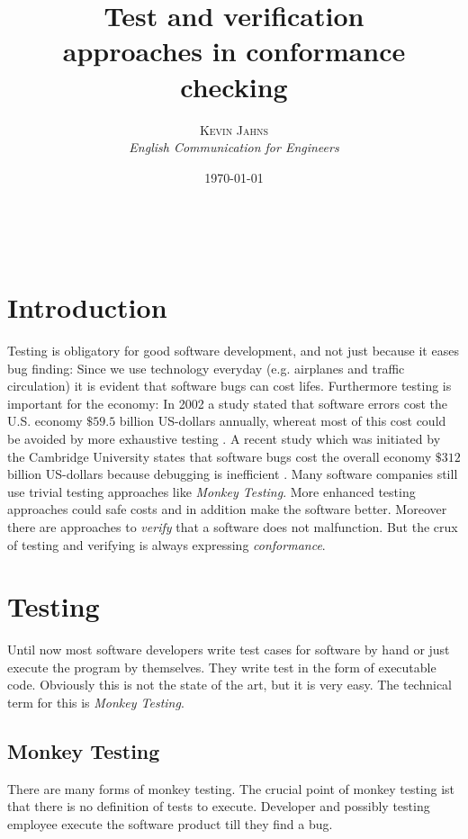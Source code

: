 \documentclass[a4paper, 12pt]{article} %
\title{\textbf{Test and verification}\\ %
approaches in conformance checking} %
\author{\textsc{Kevin Jahns} %
\\{\textit{English Communication for Engineers}}} %
\date{\today} %
\makeatletter
\renewcommand{\maketitle}{ %
\begin{flushright} %
{\LARGE\@title} %

\vspace{50pt} %

{\large\@author} %
\\\@date %

\vspace{40pt} %
\end{flushright}
}
\makeatother
\begin{document}
\maketitle %


\section*{Introduction}
Testing is obligatory for good software development, and not just because it
eases bug finding: Since we use technology everyday (e.g. airplanes and traffic
circulation) it is evident that software bugs can cost lifes. Furthermore
testing is important for the economy: In 2002 a study stated that software errors cost the U.S.
economy $ \$59.5$ billion US-dollars annually, whereat most of this cost could
be avoided by more exhaustive testing \cite{nist}. A recent study which was
initiated by the Cambridge University states that software bugs cost the 
overall economy $ \$ 312 $  billion US-dollars because debugging is inefficient
\cite{cambridge_errors}.
Many software companies still use trivial testing approaches like
\textit{Monkey Testing}. More enhanced testing approaches could safe costs and 
in addition make the software better. Moreover there are approaches to
\textit{verify} that a software does not malfunction. But the crux of
testing and verifying is always expressing \textit{conformance}. 

\section*{Testing}
Until now most software developers write test cases for software by hand or just
execute the program by themselves. They write test in the form of executable
code. Obviously this is not the state of the art, but it is very easy. The
technical term for this is \textit{Monkey Testing}.

\subsection*{Monkey Testing}
There are many forms of monkey testing. The crucial point of monkey testing ist
that there is no definition of tests to execute. Developer and possibly testing
employee execute the software product till they find a bug. 
\end{document}
